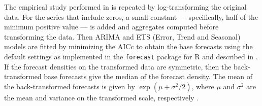 \documentclass[twocolumn]{svjour3}
\begin{document}
The empirical study performed in \citet{Wick2018} is repeated by log-transforming the original data. For the series that include zeros, a small constant --- specifically, half of the minimum positive value --- is added and aggregates computed before transforming the data. Then ARIMA and ETS {\color{red} (Error, Trend and Seasonal)} models are fitted by minimizing the AICc to obtain the base forecasts using the default settings as implemented in the \texttt{forecast} package for R \citep{forecast2016} and described in \citet{Hyndman2008}. If the forecast densities on the transformed data are symmetric, then the back-transformed base forecasts give the median of the forecast density. The mean of the back-transformed forecasts is given by $\exp\left(\mu + \sigma^2/2\right)$, where $\mu$ and $\sigma^{2}$ are the mean and variance on the transformed scale, respectively \citep[][p. 212]{Johnson1994}.
\end{document}
